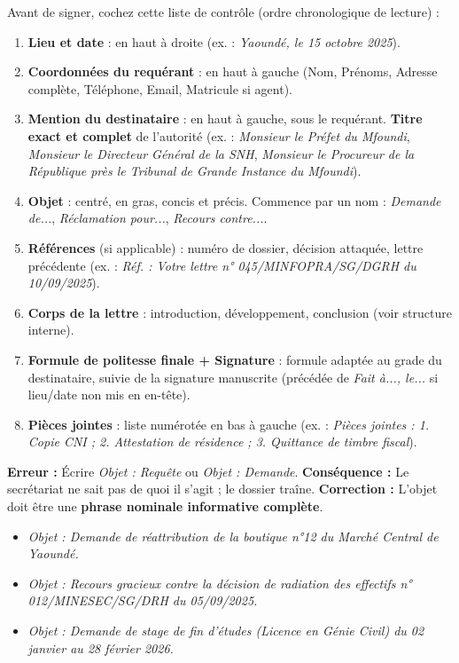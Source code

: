 \documentclass[11pt]{article}
\begin{document}
\begin{methode}
Avant de signer, cochez cette liste de contrôle (ordre chronologique de lecture) :
\begin{enumerate}
    \item \textbf{Lieu et date} : en haut à droite (ex. : \emph{Yaoundé, le 15 octobre 2025}).
    \item \textbf{Coordonnées du requérant} : en haut à gauche (Nom, Prénoms, Adresse complète, Téléphone, Email, Matricule si agent).
    \item \textbf{Mention du destinataire} : en haut à gauche, sous le requérant. \textbf{Titre exact et complet} de l'autorité (ex. : \emph{Monsieur le Préfet du Mfoundi}, \emph{Monsieur le Directeur Général de la SNH}, \emph{Monsieur le Procureur de la République près le Tribunal de Grande Instance du Mfoundi}).
    \item \textbf{Objet} : centré, en gras, concis et précis. Commence par un nom : \emph{Demande de...}, \emph{Réclamation pour...}, \emph{Recours contre...}.
    \item \textbf{Références} (si applicable) : numéro de dossier, décision attaquée, lettre précédente (ex. : \emph{Réf. : Votre lettre n° 045/MINFOPRA/SG/DGRH du 10/09/2025}).
    \item \textbf{Corps de la lettre} : introduction, développement, conclusion (voir structure interne).
    \item \textbf{Formule de politesse finale + Signature} : formule adaptée au grade du destinataire, suivie de la signature manuscrite (précédée de \emph{Fait à..., le...} si lieu/date non mis en en-tête).
    \item \textbf{Pièces jointes} : liste numérotée en bas à gauche (ex. : \emph{Pièces jointes : 1. Copie CNI ; 2. Attestation de résidence ; 3. Quittance de timbre fiscal}).
\end{enumerate}
\end{methode}

\begin{attention}
\textbf{Erreur :} Écrire \emph{Objet : Requête} ou \emph{Objet : Demande}.
\textbf{Conséquence :} Le secrétariat ne sait pas de quoi il s'agit ; le dossier traîne.
\textbf{Correction :} L'objet doit être une \textbf{phrase nominale informative complète}.
\begin{itemize}
    \item \emph{Objet : Demande de réattribution de la boutique n°12 du Marché Central de Yaoundé.}
    \item \emph{Objet : Recours gracieux contre la décision de radiation des effectifs n° 012/MINESEC/SG/DRH du 05/09/2025.}
    \item \emph{Objet : Demande de stage de fin d'études (Licence en Génie Civil) du 02 janvier au 28 février 2026.}
\end{itemize}
\end{attention}
\end{document}
